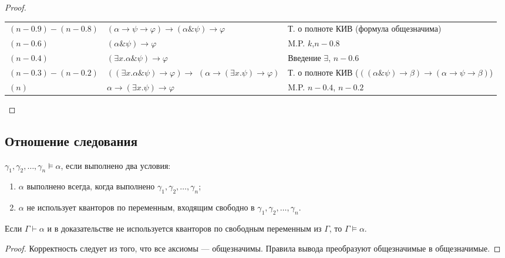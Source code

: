 \begin{proof}
\begin{itemize}
\begin{tabular}[t]{p{2.8cm} p{4.6cm} p{7cm}}
$(n-0.9)-(n-0.8)$ &
$(\alpha\rightarrow\psi\rightarrow\varphi)\rightarrow(\alpha\&\psi)\rightarrow\varphi$ & Т. о полноте КИВ (формула общезначима)\\
$(n-0.6)$ & $(\alpha \& \psi)\rightarrow\varphi$ & M.P. $k$,$n-0.8$\\
$(n-0.4)$ & $(\exists x.\alpha \& \psi)\rightarrow\varphi$ & Введение $\exists$, $n-0.6$\\
\parbox{2.8cm}{$(n-0.3)-(n-0.2)$\\} & \parbox{4.6cm}{$((\exists x. \alpha\&\psi) \rightarrow \varphi)\rightarrow$\\$(\alpha\rightarrow(\exists x. \psi)\rightarrow\varphi)$} & \parbox{7cm}{Т. о полноте КИВ \\($((\alpha\&\psi)\rightarrow\beta)\rightarrow(\alpha\rightarrow\psi\rightarrow\beta)$)}\\
$(n)$ & $\alpha\rightarrow(\exists x.\psi)\rightarrow \varphi$ & M.P. $n-0.4$, $n-0.2$
\end{tabular}

\end{itemize}
\end{proof}

\subsection{Отношение следования}

\begin{definition}[Следование]
    $\gamma_1,\gamma_2,\dots,\gamma_n\models\alpha$, если выполнено два условия:
\begin{enumerate}
\item $\alpha$ выполнено всегда, когда выполнено $\gamma_1,\gamma_2,\dots,\gamma_n$;
\item $\alpha$ не использует кванторов по переменным, входящим свободно в $\gamma_1,\gamma_2,\dots,\gamma_n$.
\end{enumerate}
\end{definition}

\begin{theorem}
    Если $\Gamma\vdash\alpha$ и в доказательстве не используется кванторов по свободным
переменным из $\Gamma$, то $\Gamma\models\alpha$.
\end{theorem}

\begin{proof}
    Корректность следует из того, что все аксиомы — общезначимы. Правила вывода преобразуют общезначимые в общезначимые.
\end{proof}

